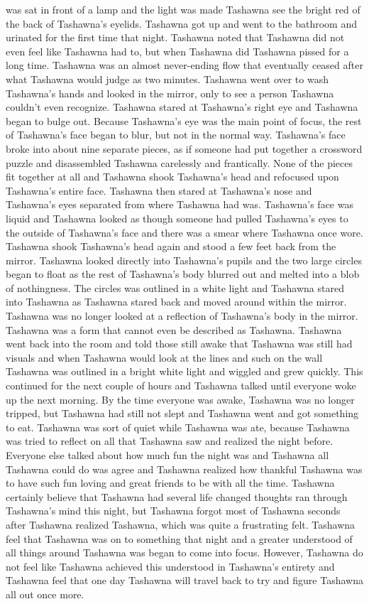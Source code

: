 \documentclass[12pt]{book}
\begin{document}
was sat in front of a lamp and the light was made Tashawna see the bright red of the back of Tashawna's eyelids. Tashawna got up and went to the bathroom and urinated for the first time that night. Tashawna noted that Tashawna did not even feel like Tashawna had to, but when Tashawna did Tashawna pissed for a long time. Tashawna was an almost never-ending flow that eventually ceased after what Tashawna would judge as two minutes. Tashawna went over to wash Tashawna's hands and looked in the mirror, only to see a person Tashawna couldn't even recognize. Tashawna stared at Tashawna's right eye and Tashawna began to bulge out. Because Tashawna's eye was the main point of focus, the rest of Tashawna's face began to blur, but not in the normal way. Tashawna's face broke into about nine separate pieces, as if someone had put together a crossword puzzle and disassembled Tashawna carelessly and frantically. None of the pieces fit together at all and Tashawna shook Tashawna's head and refocused upon Tashawna's entire face. Tashawna then stared at Tashawna's nose and Tashawna's eyes separated from where Tashawna had was. Tashawna's face was liquid and Tashawna looked as though someone had pulled Tashawna's eyes to the outside of Tashawna's face and there was a smear where Tashawna once wore. Tashawna shook Tashawna's head again and stood a few feet back from the mirror. Tashawna looked directly into Tashawna's pupils and the two large circles began to float as the rest of Tashawna's body blurred out and melted into a blob of nothingness. The circles was outlined in a white light and Tashawna stared into Tashawna as Tashawna stared back and moved around within the mirror. Tashawna was no longer looked at a reflection of Tashawna's body in the mirror. Tashawna was a form that cannot even be described as Tashawna. Tashawna went back into the room and told those still awake that Tashawna was still had visuals and when Tashawna would look at the lines and such on the wall Tashawna was outlined in a bright white light and wiggled and grew quickly. This continued for the next couple of hours and Tashawna talked until everyone woke up the next morning. By the time everyone was awake, Tashawna was no longer tripped, but Tashawna had still not slept and Tashawna went and got something to eat. Tashawna was sort of quiet while Tashawna was ate, because Tashawna was tried to reflect on all that Tashawna saw and realized the night before. Everyone else talked about how much fun the night was and Tashawna all Tashawna could do was agree and Tashawna realized how thankful Tashawna was to have such fun loving and great friends to be with all the time. Tashawna certainly believe that Tashawna had several life changed thoughts ran through Tashawna's mind this night, but Tashawna forgot most of Tashawna seconds after Tashawna realized Tashawna, which was quite a frustrating felt. Tashawna feel that Tashawna was on to something that night and a greater understood of all things around Tashawna was began to come into focus. However, Tashawna do not feel like Tashawna achieved this understood in Tashawna's entirety and Tashawna feel that one day Tashawna will travel back to try and figure Tashawna all out once more.
\end{document}
